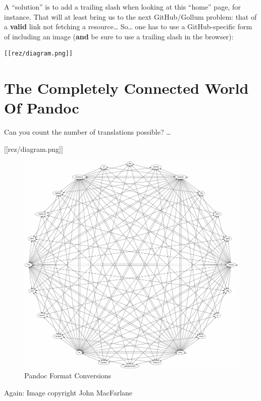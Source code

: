 \documentclass[oneside,]{memoir}
\makeatletter
\def\maxwidth{\ifdim\Gin@nat@width>\linewidth\linewidth
\else\Gin@nat@width\fi}
\let\Oldincludegraphics\includegraphics
\renewcommand{\includegraphics}[1]{\Oldincludegraphics[width=\maxwidth]{#1}}
\makeatother
\begin{document}
A ``solution'' is to add a trailing slash when looking at this ``home''
page, for instance. That will at least bring us to the next
GitHub/Gollum problem: that of a \textbf{valid} link not fetching a
resource\ldots{} So\ldots{} one has to use a GitHub-specific form of
including an image (\textbf{and} be sure to use a trailing slash in the
browser):

\begin{verbatim}
[[rez/diagram.png]]
\end{verbatim}
\section{The Completely Connected World Of Pandoc}

Can you count the number of translations possible? \ldots{}

{[}{[}rez/diagram.png{]}{]}

\begin{figure}[htbp]
\centering
\includegraphics{rez/diagram.png}
\caption{Pandoc Format Conversions}
\end{figure}

Again: Image copyright John MacFarlane
\end{document}
